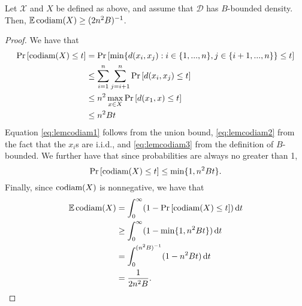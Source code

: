 \documentclass[../main.tex]{subfiles}
\newcommand{\set}[1]{\mathcal {#1}}
\newcommand{\distribution}[1]{\mathcal {#1}}
\newcommand{\dist}[2]{\distf({#1},{#2})}
\newcommand{\distf}{d}
\newcommand{\codiam}[1]{\textnormal{codiam}({#1})}
\begin{document}
\begin{lemma}
    \label{lemma:Ecodiam}
    Let $\set X$ and $X$ be defined as above,
    and assume that $\distribution D$ has $B$-bounded density.
    Then, $\E\codiam{X} \ge (2n^2B)^{-1}$.
\end{lemma}
\begin{proof}
    We have that
    \begin{align}
        \prob{\codiam{X} \le t}
        &=
        \prob{\min \{ \dist{x_i}{x_j} : i\in\{1,...,n\}, j\in\{i+1,...,n\} \} \le t}
        \\ &\le 
        \sum_{i=1}^n\sum_{j=i+1}^n \prob{\dist{x_i}{x_j} \le t}
        \label{eq:lemcodiam1}
        \\ & \le
        n^2 \max_{x\in X} \prob{\dist{x_1}{x} \le t}
        \label{eq:lemcodiam2}
        \\ & \le 
        n^2 B t
        \label{eq:lemcodiam3}
    \end{align}
    Equation \eqref{eq:lemcodiam1} follows from the union bound,
    \eqref{eq:lemcodiam2} from the fact that the $x_i$s are i.i.d.,
    and \eqref{eq:lemcodiam3} from the definition of $B$-bounded.
    We further have that since probabilities are always no greater than 1,
    \begin{equation}
        \prob{\codiam{X}\le t} \le \min\{1,n^2Bt\}
        .
    \end{equation}
    Finally, since $\codiam{X}$ is nonnegative, we have that 
    \begin{align}
        \E \codiam{X}
        &=
        \int_0^\infty (1-\prob{\codiam{X} \le t}) \dd t
        \\ & \ge
        \int_0^\infty (1-\min\{1,n^2 Bt\}) \dd t
        \\ & = 
        \int_0^{(n^2B)^{-1}} (1 - n^2 Bt) \dd t
        \\ & =
        \frac{1}{2n^2B}
        \label{eq:Ecodiamproof}
        .
    \end{align}
\end{proof}

\end{document}
